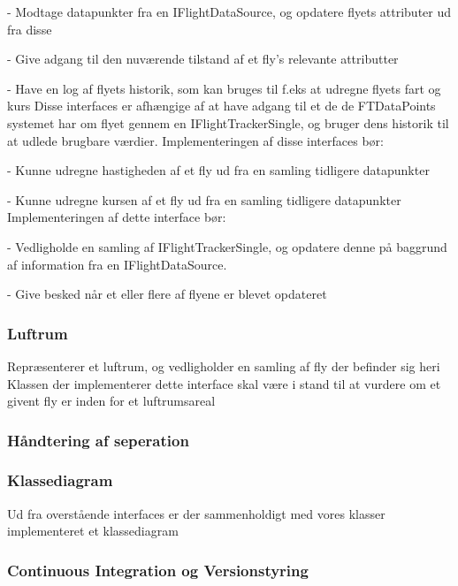 - Modtage datapunkter fra en IFlightDataSource, og opdatere flyets attributer ud fra disse

- Give adgang til den nuværende tilstand af et fly's relevante attributter

- Have en log af flyets historik, som kan bruges til f.eks at udregne flyets fart og kurs
Disse interfaces er afhængige af at have adgang til et de de FTDataPoints systemet har om flyet gennem en IFlightTrackerSingle, og bruger dens historik til at udlede brugbare værdier.
Implementeringen af disse interfaces bør:

- Kunne udregne hastigheden af et fly ud fra en samling tidligere datapunkter

- Kunne udregne kursen af et fly ud fra en samling tidligere datapunkter
Implementeringen af dette interface bør:

- Vedligholde en samling af IFlightTrackerSingle, og opdatere denne på baggrund af information fra en IFlightDataSource.

- Give besked når et eller flere af flyene er blevet opdateret
\newpage
\subsubsection{Luftrum}

Repræsenterer et luftrum, og vedligholder en samling af fly der befinder sig heri
Klassen der implementerer dette interface skal være i stand til at vurdere om et givent fly er inden for et luftrumsareal
\subsubsection{Håndtering af seperation}
\newpage
\subsubsection{Klassediagram}
Ud fra overstående interfaces er der sammenholdigt med vores klasser implementeret et klassediagram


\subsubsection{Continuous Integration og Versionstyring}

